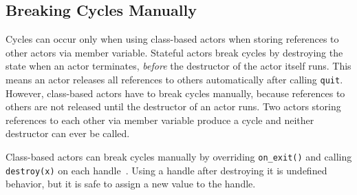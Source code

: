 \subsection{Breaking Cycles Manually}
\label{breaking-cycles}

Cycles can occur only when using class-based actors when storing references to other actors via member variable. Stateful actors  break cycles by destroying the state when an actor terminates, \emph{before} the destructor of the actor itself runs. This means an actor releases all references to others automatically after calling \lstinline^quit^. However, class-based actors have to break cycles manually, because references to others are not released until the destructor of an actor runs. Two actors storing references to each other via member variable produce a cycle and neither destructor can ever be called.

Class-based actors can break cycles manually by overriding \lstinline^on_exit()^ and calling \lstinline^destroy(x)^ on each handle~. Using a handle after destroying it is undefined behavior, but it is safe to assign a new value to the handle.

